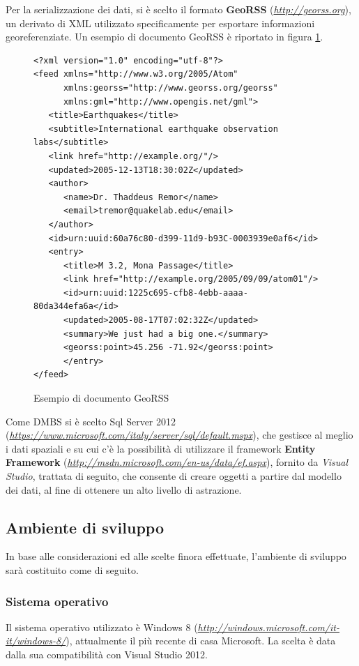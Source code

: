Per la serializzazione dei dati, si è scelto il formato \textbf{GeoRSS} (\emph{\url{http://georss.org}}), un derivato di XML utilizzato specificamente per esportare informazioni georeferenziate.
Un esempio di documento GeoRSS è riportato in figura \ref{georssimage}.
\begin{figure}[h!]
\lstset{language=MYXML}
\begin{lstlisting}
<?xml version="1.0" encoding="utf-8"?>
<feed xmlns="http://www.w3.org/2005/Atom" 
      xmlns:georss="http://www.georss.org/georss" 
      xmlns:gml="http://www.opengis.net/gml">
   <title>Earthquakes</title>
   <subtitle>International earthquake observation labs</subtitle>
   <link href="http://example.org/"/>
   <updated>2005-12-13T18:30:02Z</updated>
   <author>
      <name>Dr. Thaddeus Remor</name>
      <email>tremor@quakelab.edu</email>
   </author>
   <id>urn:uuid:60a76c80-d399-11d9-b93C-0003939e0af6</id>
   <entry>
      <title>M 3.2, Mona Passage</title>
      <link href="http://example.org/2005/09/09/atom01"/>
      <id>urn:uuid:1225c695-cfb8-4ebb-aaaa-80da344efa6a</id>
      <updated>2005-08-17T07:02:32Z</updated>
      <summary>We just had a big one.</summary>
      <georss:point>45.256 -71.92</georss:point>
      </entry>
</feed>
\end{lstlisting}
\caption{Esempio di documento GeoRSS\label{georssimage}}
\end{figure}

Come DMBS si è scelto Sql Server 2012 (\emph{\url{https://www.microsoft.com/italy/server/sql/default.mspx}}), che gestisce al meglio i dati spaziali e su cui c'è la possibilità di utilizzare il framework \textbf{Entity Framework} (\emph{\url{http://msdn.microsoft.com/en-us/data/ef.aspx}}), fornito da \textit{Visual Studio}, trattata di seguito, che consente di creare oggetti a partire dal modello dei dati, al fine di ottenere un alto livello di astrazione.  

\subsection{Ambiente di sviluppo}
In base alle considerazioni ed alle scelte finora effettuate, l'ambiente di sviluppo sarà costituito come di seguito.

\subsubsection{Sistema operativo}
Il sistema operativo utilizzato è Windows 8 (\emph{\url{http://windows.microsoft.com/it-it/windows-8/}}), attualmente il più recente di casa Microsoft.
La scelta è data dalla sua compatibilità con Visual Studio 2012.

